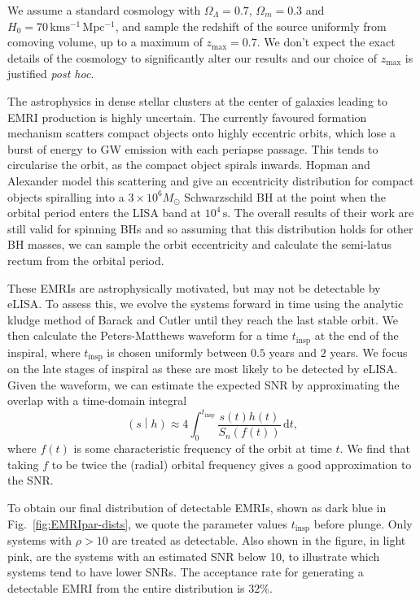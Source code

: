 \documentclass[aps,prd,amsfonts,amssymb,amsmath,nofootinbib,showpacs,superscriptaddress,twocolumn]{revtex4}
\newcommand{\figref}[1]{Fig.\ \ref{fig:#1}}
\newcommand{\dd}{\ensuremath{\mathrm{d}}}
\newcommand{\intd}[4]{\ensuremath{\int_{#1}^{#2}{#3}\,\dd{#4}}}
\newcommand{\overlap}[2]{\ensuremath{\left(#1\middle|#2\right)}}
\begin{document}
We assume a standard cosmology with $\Omega_\Lambda = 0.7$, $\Omega_m = 0.3$ and $H_0 = 70\,\mathrm{km s^{-1}\, Mpc^{-1}}$, and sample the redshift of the source uniformly from comoving volume, up to a maximum of $z_\mathrm{max} = 0.7$. We don't expect the exact details of the cosmology to significantly alter our results and our choice of $z_\mathrm{max}$ is justified \textit{post hoc}.

The astrophysics in dense stellar clusters at the center of galaxies leading to EMRI production is highly uncertain. The currently favoured formation mechanism scatters compact objects onto highly eccentric orbits, which lose a burst of energy to GW emission with each periapse passage. This tends to circularise the orbit, as the compact object spirals inwards. Hopman and Alexander \cite{Hopman2005} model this scattering and give an eccentricity distribution for compact objects spiralling into a $3 \times 10^6 M_\odot$ Schwarzschild BH at the point when the orbital period enters the LISA band at $10^4\,\mathrm{s}$. The overall results of their work are still valid for spinning BHs and so assuming that this distribution holds for other BH masses, we can sample the orbit eccentricity and calculate the semi-latus rectum from the orbital period.

These EMRIs are astrophysically motivated, but may not be detectable by eLISA. To assess this, we evolve the systems forward in time using the analytic kludge method of Barack and Cutler \cite{Barack2004} until they reach the last stable orbit. We then calculate the Peters-Matthews waveform \cite{Peters1963} for a time $t_\mathrm{insp}$ at the end of the inspiral, where $t_\mathrm{insp}$ is chosen uniformly between $0.5$ years and $2$ years. We focus on the late stages of inspiral as these are most likely to be detected by eLISA. Given the waveform, we can estimate the expected SNR by approximating the overlap with a time-domain integral
\begin{equation}
\overlap{s}{h} \approx 4 \intd{0}{t_\mathrm{insp}}{\frac{s(t)h(t)}{S_n(f(t))}}{t},
\end{equation}
where $f(t)$ is some characteristic frequency of the orbit at time $t$. We find that taking $f$ to be twice the (radial) orbital frequency gives a good approximation to the SNR.

To obtain our final distribution of detectable EMRIs, shown as dark blue in \figref{EMRIpar-dists}, we quote the parameter values $t_\mathrm{insp}$ before plunge. Only systems with $\rho > 10$ are treated as detectable. Also shown in the figure, in light pink, are the systems with an estimated SNR below 10, to illustrate which systems tend to have lower SNRs. The acceptance rate for generating a detectable EMRI from the entire distribution is $32\%$.
\end{document}
